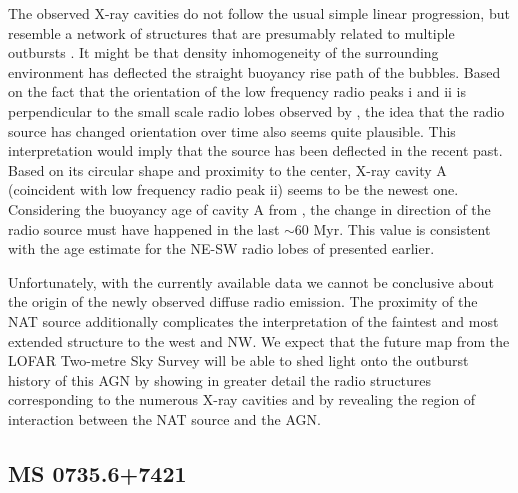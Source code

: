 \documentclass{aa}  %
\begin{document}
The observed X-ray cavities do not follow the usual simple linear progression, but resemble a network of structures that are presumably related to multiple outbursts \citep{Sanders2009}.
It might be that density inhomogeneity of the surrounding environment has deflected the straight buoyancy rise path of the bubbles. %
Based on the fact that the orientation of the low frequency radio peaks i and ii is perpendicular to the small scale radio lobes observed by \cite{Donahue2007}, the idea that the radio source has changed orientation over time also seems quite plausible.
This interpretation would imply that the source has been deflected in the recent past.
Based on its circular shape and proximity to the center, X-ray cavity A (coincident with low frequency radio peak ii) seems to be the newest one. 
Considering the buoyancy age of cavity A from \cite{Rafferty2006}, the change in direction of the radio source must have happened in the last $\sim60$ Myr. 
This value is consistent with the age estimate for the NE-SW radio lobes of \cite{Donahue2007} presented earlier.  %

Unfortunately, with the currently available data we cannot be conclusive about the origin of the newly observed diffuse radio emission.
The proximity of the NAT source additionally complicates the interpretation of the faintest and most extended structure to the west and NW.
We expect that the future map from the LOFAR Two-metre Sky Survey \citep[LoTSS;][]{Shimwell2017} will be able to shed light onto the outburst history of this AGN by showing in greater detail the radio structures corresponding to the numerous X-ray cavities and by revealing the region of interaction between the NAT source and the AGN.


 
 
 
 
 \subsection{MS 0735.6+7421}
 
\end{document}
